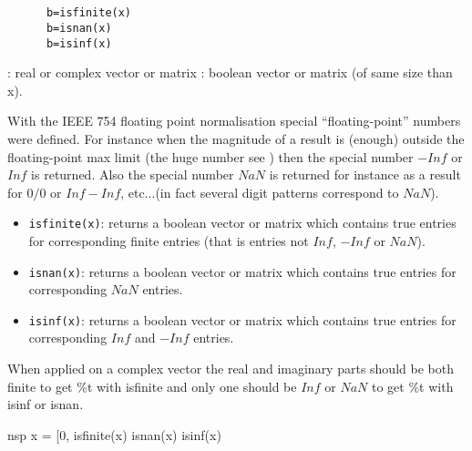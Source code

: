 

\begin{mandesc}
\\
\\
\end{mandesc}

\begin{calling_sequence}
\begin{verbatim}
      b=isfinite(x)  
      b=isnan(x)  
      b=isinf(x)  
\end{verbatim}
\end{calling_sequence}

\begin{parameters}
  \begin{varlist}
    : real or complex vector or matrix
    : boolean vector or matrix (of same size than x).
  \end{varlist}
\end{parameters}
\begin{mandescription}
  With the IEEE 754 floating point normalisation special ``floating-point''
  numbers were defined. For instance when the magnitude of a result is (enough)
  outside the floating-point max limit (the huge number see
  ) then the special number
  $-Inf$ or $Inf$ is returned. Also the special number $NaN$ is returned for
  instance as a result for $0 / 0$ or $Inf - Inf$, etc...(in fact several digit
  patterns correspond to $NaN$).
  \begin{itemize}
  \item \verb!isfinite(x)!: returns a boolean vector or matrix which contains true
    entries for corresponding finite entries (that is entries not $Inf$, $-Inf$ or
    $NaN$).
  \item \verb!isnan(x)!: returns a boolean vector or matrix which contains true
    entries for corresponding $NaN$ entries.
  \item \verb!isinf(x)!: returns a boolean vector or matrix which contains true
    entries for corresponding $Inf$ and $-Inf$ entries.
  \end{itemize}
  When applied on a complex vector the real and imaginary parts should
  be both finite to get \%t with isfinite and only one should be $Inf$
  or $NaN$ to get \%t with isinf or isnan. 
\end{mandescription}
\begin{examples}
\begin{mintednsp}{nsp}
  x = [0, %
  isfinite(x)
  isnan(x)
  isinf(x)
\end{mintednsp}
\end{examples}
\begin{manseealso}
\end{manseealso}

